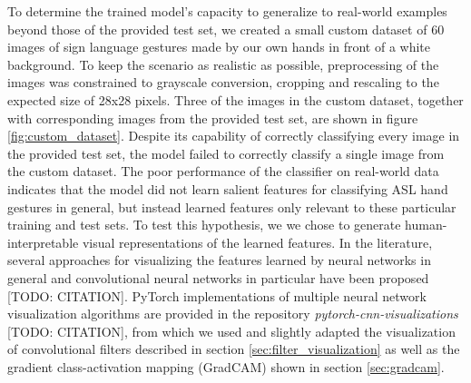\documentclass[a4paper]{article}
\begin{document}
To determine the trained model's capacity to generalize to real-world examples beyond those of the provided test set, we created a small custom dataset of 60 images of sign language gestures made by our own hands in front of a white background. To keep the scenario as realistic as possible, preprocessing of the images was constrained to grayscale conversion, cropping and rescaling to the expected size of 28x28 pixels. Three of the images in the custom dataset, together with corresponding images from the provided test set, are shown in figure \ref{fig:custom_dataset}. Despite its capability of correctly classifying every image in the provided test set, the model failed to correctly classify a single image from the custom dataset. The poor performance of the classifier on real-world data indicates that the model did not learn salient features for classifying ASL hand gestures in general, but instead learned features only relevant to these particular training and test sets. To test this hypothesis, we we chose to generate human-interpretable visual representations of the learned features. In the literature, several approaches for visualizing the features learned by neural networks in general and convolutional neural networks in particular have been proposed [TODO: CITATION]. PyTorch implementations of multiple neural network visualization algorithms are provided in the repository \textit{pytorch-cnn-visualizations} [TODO: CITATION], from which we used and slightly adapted the visualization of convolutional filters described in section \ref{sec:filter_visualization} as well as the gradient class-activation mapping (GradCAM) shown in section \ref{sec:gradcam}.
\end{document}
